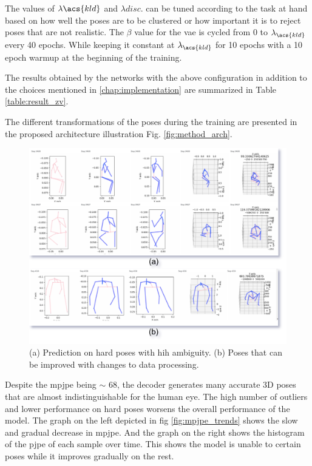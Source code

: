 The values of $\lambda{\acs{kld}}$ and $\lambda{disc.}$ can be tuned according to the task at hand based on how well the poses are to be clustered or how important it is to reject poses that are not realistic. The $\beta$ value for the \ac{vae} is cycled from 0 to $\lambda_{\acs{kld}}$ every 40 epochs. While keeping it constant at $\lambda_{\acs{kld}}$ for 10 epochs with a 10 epoch warmup at the beginning of the training. %

The results obtained by the networks with the above configuration in addition to the choices mentioned in \ref{chap:implementation} are summarized in Table \ref{table:result_zv}.




The different transformations of the poses during the training are presented in the proposed architecture illustration Fig. \ref{fig:method_arch}.  

\begin{figure}[h]
    \centering
    \includegraphics[scale=0.2]{figures/results/bad_samples.png}
    \caption{(a) Prediction on hard poses with hih ambiguity. (b) Poses that can be improved with changes to data processing.}
    \label{fig:bad_samples}
\end{figure}

Despite the \ac{mpjpe} being $\sim$ 68, the decoder generates many accurate 3D poses that are almost indistinguishable for the human eye. The high number of outliers and lower performance on hard poses worsens the overall performance of the model. The graph on the left depicted in fig \ref{fig:mpjpe_trends} shows the slow and gradual decrease in \ac{mpjpe}. And the graph on the right shows the histogram of the \ac{pjpe} of each sample over time. This shows the model is unable to certain poses while it improves gradually on the rest. 

